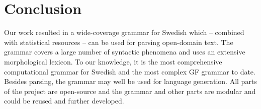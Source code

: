 \documentclass[runningheads,a4paper]{llncs}
\begin{document}

%






\section{Conclusion}
Our work resulted in a wide-coverage grammar for Swedish which --
combined with statistical resources -- can be used for parsing 
open-domain text. The grammar covers a large number of syntactic 
phenomena and uses an extensive morphological lexicon. To
our knowledge, it is the most comprehensive computational grammar for
Swedish and the most complex GF grammar to date.
Besides parsing, the grammar may well be used for language generation.
All parts of the project are open-source and the grammar and other parts
are modular and could be reused and further developed.



\end{document}
